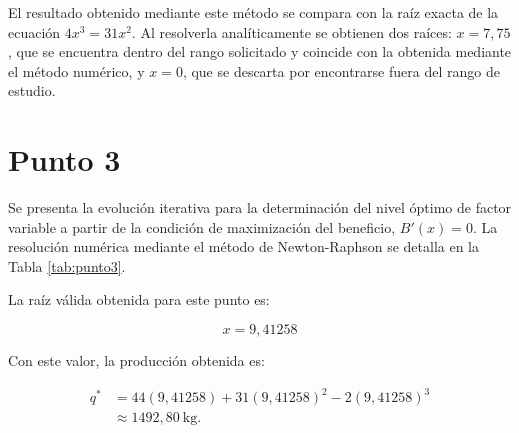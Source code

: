 El resultado obtenido mediante este método se compara con la raíz exacta de la ecuación $4x^3 = 31x^2$. Al resolverla analíticamente se obtienen dos raíces: $x = 7{,}75$, que se encuentra dentro del rango solicitado y coincide con la obtenida mediante el método numérico, y $x = 0$, que se descarta por encontrarse fuera del rango de estudio.


\section{Punto 3}

Se presenta la evolución iterativa para la determinación del nivel óptimo de factor variable a partir de la condición de maximización del beneficio, $B'(x)=0$. La resolución numérica mediante el método de Newton-Raphson se detalla en la Tabla \ref{tab:punto3}.

\begin{table}[htbp]
\centering
{}
\caption{Resultado de la raíz del Punto 3 por el método de Newton-Raphson.}
\label{tab:punto3}
\end{table}

La raíz válida obtenida para este punto es:

\begin{equation}
    \boxed{x = 9{,}41258}
\end{equation}

Con este valor, la producción obtenida es:

\begin{equation}
\begin{aligned}
q^* &= 44(9{,}41258) + 31(9{,}41258)^2 - 2(9{,}41258)^3 \\
&\approx 1492{,}80\ \text{kg}.
\end{aligned}
\end{equation}

